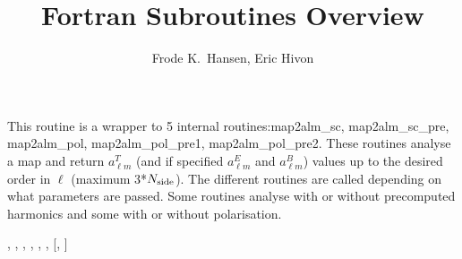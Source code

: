 
\sloppy


\title{\healpix Fortran Subroutines Overview}
 \section[map2alm*]{ }
\label{sub:map2alm}
\author{Frode K.~Hansen, Eric Hivon}

\begin{facility}
{This routine is a wrapper to 5 internal routines:map2alm\_sc,
map2alm\_sc\_pre, map2alm\_pol, map2alm\_pol\_pre1,
map2alm\_pol\_pre2. These routines analyse a  map and return
$a_{\ell m}^T$ (and if specified $a_{\ell m}^E$ and $a_{\ell m}^B$) values up to
the desired order in $\ell$ (maximum 3*$N_\mathrm{side}$). The different
routines are called depending on what parameters are passed. Some
routines analyse with or without precomputed harmonics and some with
or without polarisation. }
{\modAlmTools}
\end{facility}

\begin{f90format}
{%
, %
, %
, %
, %
, %
, %
 [, %
]}
\end{f90format}

